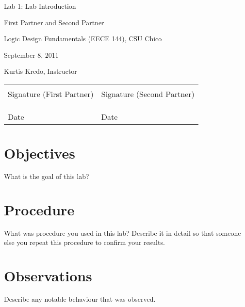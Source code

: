 \documentclass[12pt]{article}
\begin{document}

\null
\thispagestyle{empty}
\vfill
\centerline{\LARGE Lab 1: Lab Introduction}
\vspace{0.3in}
\centerline{First Partner and Second Partner}
\centerline{Logic Design Fundamentals (EECE 144), CSU Chico}
\centerline{September 8, 2011}
\centerline{Kurtis Kredo, Instructor}
\vspace{5in}

\begin{center}
\begin{tabular}{l l}
\uline{\hspace{2.5in}} & \uline{\hspace{2.5in}} \\
Signature (First Partner) & Signature (Second Partner) \\
& \\
& \\
\uline{\hspace{2.5in}} & \uline{\hspace{2.5in}} \\
Date & Date \\
\end{tabular}
\end{center}

\vfill  %
\pagebreak

\tableofcontents

\pagebreak

\section{Objectives}

What is the goal of this lab?

\section{Procedure}

What was procedure you used in this lab?
Describe it in detail so that someone else you repeat
this procedure to confirm your results.

\section{Observations}

Describe any notable behaviour that was observed.
\nocite{LOGISIM}
\end{document}
